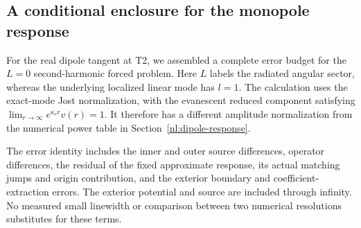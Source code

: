 \subsection{A conditional enclosure for the monopole response}
\label{nl:conditional-monopole}
For the real dipole tangent at T2, we assembled a complete error budget
for the $L=0$ second-harmonic forced problem. Here $L$ labels the
radiated angular sector, whereas the underlying localized linear mode
has $l=1$. The calculation uses the exact-mode Jost normalization,
with the evanescent reduced component satisfying
$\lim_{r\to\infty}e^{\kappa_c r}v(r)=1$.
It therefore has a different amplitude normalization from the numerical
power table in Section~\ref{nl:dipole-response}.

The error identity includes the inner and outer source differences,
operator differences, the residual of the fixed approximate response,
its actual matching jumps and origin contribution, and the exterior
boundary and coefficient-extraction errors. The exterior potential and
source are included through infinity. No measured small linewidth or
comparison between two numerical resolutions substitutes for these terms.

